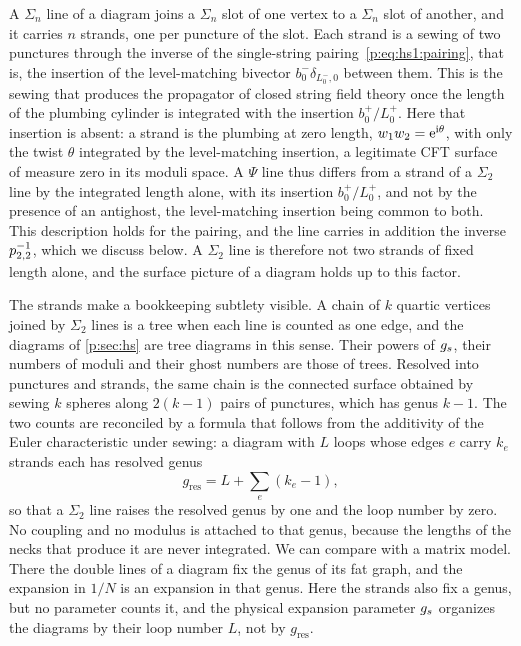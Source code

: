 A $\Sigma_n$ line of a diagram joins a $\Sigma_n$ slot of one vertex to a $\Sigma_n$ slot of another, and it carries $n$ strands, one per puncture of the slot.
Each strand is a sewing of two punctures through the inverse of the single-string pairing~\eqref{p:eq:hs1:pairing}, that is, the insertion of the level-matching bivector $b_0^- \delta_{L_0^-, 0}$ between them.
This is the sewing that produces the propagator of closed string field theory once the length of the plumbing cylinder is integrated with the insertion $b_0^+ / L_0^+$.
Here that insertion is absent: a strand is the plumbing at zero length, $w_1 w_2 = \mathrm{e}^{\mathrm{i} \theta}$, with only the twist $\theta$ integrated by the level-matching insertion, a legitimate CFT surface of measure zero in its moduli space.
A $\Psi$ line thus differs from a strand of a $\Sigma_2$ line by the integrated length alone, with its insertion $b_0^+ / L_0^+$, and not by the presence of an antighost, the level-matching insertion being common to both.
  This description holds for the pairing, and the line carries in addition the inverse $p_{2,2}^{-1}$, which we discuss below.
A $\Sigma_2$ line is therefore not two strands of fixed length alone, and the surface picture of a diagram holds up to this factor.

The strands make a bookkeeping subtlety visible.
A chain of $k$ quartic vertices joined by $\Sigma_2$ lines is a tree when each line is counted as one edge, and the diagrams of \cref{p:sec:hs} are tree diagrams in this sense.
Their powers of $g_s$, their numbers of moduli and their ghost numbers are those of trees.
Resolved into punctures and strands, the same chain is the connected surface obtained by sewing $k$ spheres along $2 (k - 1)$ pairs of punctures, which has genus $k - 1$.
The two counts are reconciled by a formula that follows from the additivity of the Euler characteristic under sewing: a diagram with $L$ loops whose edges $e$ carry $k_e$ strands each has resolved genus
\begin{equation}
  \label{p:eq:ws:genus}
  g_{\mathrm{res}}
    = L + \sum_e (k_e - 1),
\end{equation}
so that a $\Sigma_2$ line raises the resolved genus by one and the loop number by zero.
No coupling and no modulus is attached to that genus, because the lengths of the necks that produce it are never integrated.
We can compare with a matrix model.
  There the double lines of a diagram fix the genus of its fat graph, and the expansion in $1 / N$ is an expansion in that genus.
  Here the strands also fix a genus, but no parameter counts it, and the physical expansion parameter $g_s$ organizes the diagrams by their loop number $L$, not by $g_{\mathrm{res}}$.

